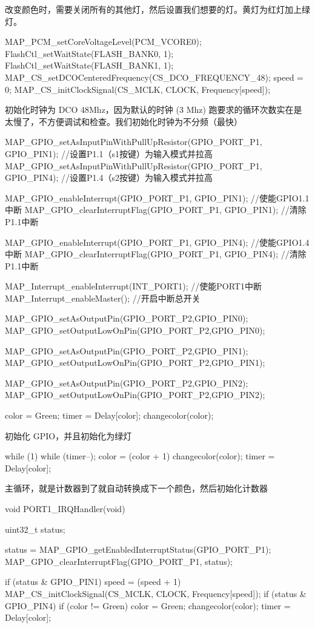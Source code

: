 \documentclass[a4paper,10pt,UTF8]{paper}
\numberwithin{equation}{section}
\numberwithin{figure}{section}
\begin{document}
改变颜色时，需要关闭所有的其他灯，然后设置我们想要的灯。黄灯为红灯加上绿灯。

\begin{ccode}
  MAP_PCM_setCoreVoltageLevel(PCM_VCORE0);    
  FlashCtl_setWaitState(FLASH_BANK0, 1);
  FlashCtl_setWaitState(FLASH_BANK1, 1);
  MAP_CS_setDCOCenteredFrequency(CS_DCO_FREQUENCY_48);
  speed = 0;
  MAP_CS_initClockSignal(CS_MCLK, CLOCK, Frequency[speed]); 
\end{ccode}

初始化时钟为 DCO 48Mhz，因为默认的时钟 (3 Mhz) 跑要求的循环次数实在是太慢了，不方便调试和检查。我们初始化时钟为不分频（最快）

\begin{ccode}
  MAP_GPIO_setAsInputPinWithPullUpResistor(GPIO_PORT_P1, GPIO_PIN1);  //设置P1.1（s1按键）为输入模式并拉高  
  MAP_GPIO_setAsInputPinWithPullUpResistor(GPIO_PORT_P1, GPIO_PIN4);  //设置P1.4（s2按键）为输入模式并拉高
  
  MAP_GPIO_enableInterrupt(GPIO_PORT_P1, GPIO_PIN1);  //使能GPIO1.1中断
  MAP_GPIO_clearInterruptFlag(GPIO_PORT_P1, GPIO_PIN1);   //清除P1.1中断 
  
  MAP_GPIO_enableInterrupt(GPIO_PORT_P1, GPIO_PIN4);  //使能GPIO1.4中断
  MAP_GPIO_clearInterruptFlag(GPIO_PORT_P1, GPIO_PIN4);   //清除P1.1中断 
  
  MAP_Interrupt_enableInterrupt(INT_PORT1); //使能PORT1中断
  MAP_Interrupt_enableMaster();  //开启中断总开关  
  
  MAP_GPIO_setAsOutputPin(GPIO_PORT_P2,GPIO_PIN0);
  MAP_GPIO_setOutputLowOnPin(GPIO_PORT_P2,GPIO_PIN0);
  
  MAP_GPIO_setAsOutputPin(GPIO_PORT_P2,GPIO_PIN1);
  MAP_GPIO_setOutputLowOnPin(GPIO_PORT_P2,GPIO_PIN1);
  
  MAP_GPIO_setAsOutputPin(GPIO_PORT_P2,GPIO_PIN2);
  MAP_GPIO_setOutputLowOnPin(GPIO_PORT_P2,GPIO_PIN2);
  
  color = Green;
  timer = Delay[color];
  changecolor(color);
\end{ccode}

初始化 GPIO，并且初始化为绿灯

\begin{ccode}
  while (1) {
    while (timer--);
    color = (color + 1) %
    changecolor(color);
    timer = Delay[color];
  }
\end{ccode}

主循环，就是计数器到了就自动转换成下一个颜色，然后初始化计数器

\begin{ccode}
  void PORT1_IRQHandler(void)
  {
    uint32_t status;

    status = MAP_GPIO_getEnabledInterruptStatus(GPIO_PORT_P1);
    MAP_GPIO_clearInterruptFlag(GPIO_PORT_P1, status);

    if (status & GPIO_PIN1) {
      speed = (speed + 1) %
      MAP_CS_initClockSignal(CS_MCLK, CLOCK, Frequency[speed]);
    }
    if (status & GPIO_PIN4) {
      if (color != Green) {
        color = Green;
        changecolor(color);
        timer = Delay[color];
      }
    }
  }
\end{ccode}
\end{document}
